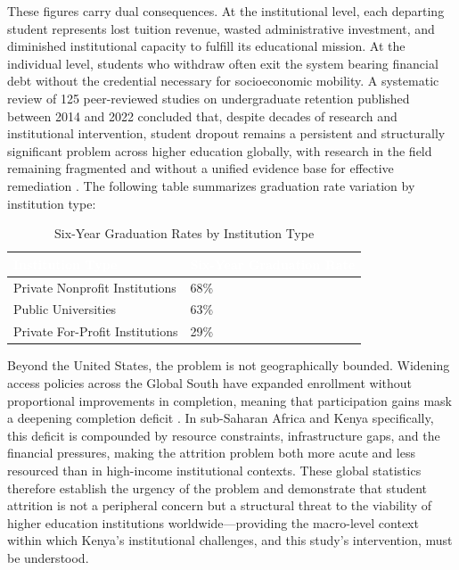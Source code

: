 \documentclass[12pt]{report}
\begin{document}
These figures carry dual consequences. At the institutional level, each
departing student represents lost tuition revenue, wasted administrative
investment, and diminished institutional capacity to fulfill its educational
mission. At the individual level, students who withdraw often exit the system
bearing financial debt without the credential necessary for socioeconomic
mobility. A systematic review of 125 peer-reviewed studies on undergraduate
retention published between 2014 and 2022 concluded that, despite decades of
research and institutional intervention, student dropout remains a persistent
and structurally significant problem across higher education globally, with
research in the field remaining fragmented and without a unified evidence base
for effective remediation \parencite{Goncalves2024}. The following table
summarizes graduation rate variation by institution type:

\begin{table}[H]
    \centering
    \caption{Six-Year Graduation Rates by Institution Type \parencite{NCES2024}}
    \label{tab:graduation_rates}
    {
    \begin{tabular}{|p{7cm}|p{5cm}|}
    \hline
    \rowcolor{tableblue}
    \textcolor{white}{\textbf{Institution Type}} &
    \textcolor{white}{\textbf{Six-Year Graduation Rate}} \\ \hline
    Private Nonprofit Institutions  & 68\% \\ \hline
    Public Universities             & 63\% \\ \hline
    Private For-Profit Institutions & 29\% \\ \hline
    \end{tabular}}
\end{table}

Beyond the United States, the problem is not geographically bounded.
Widening access policies across the Global South have expanded enrollment
without proportional improvements in completion, meaning that participation
gains mask a deepening completion deficit \parencite{Goncalves2024}. In
sub-Saharan Africa and Kenya specifically, this deficit is compounded by
resource constraints, infrastructure gaps, and the financial pressures, making
the attrition problem both more acute and less resourced than in high-income
institutional contexts. These global statistics therefore establish the urgency
of the problem and demonstrate that student attrition is not a peripheral concern
but a structural threat to the viability of higher education institutions
worldwide---providing the macro-level context within which Kenya's institutional
challenges, and this study's intervention, must be understood.
\end{document}
